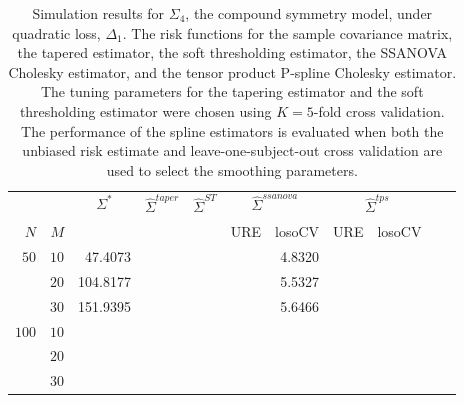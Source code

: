 \documentclass[12pt]{article}
\newcommand{\ra}[1]{\renewcommand{\arraystretch}{#1}}
\theoremstyle{definition}
\begin{document}
\begin{table}\centering
\ra{1.3}
\caption{Simulation results for $\Sigma_4$, the compound symmetry model, under quadratic loss, $\Delta_1$. The risk functions for the sample covariance matrix, the tapered estimator, the soft thresholding estimator, the SSANOVA Cholesky estimator, and the tensor product P-spline Cholesky estimator. The tuning parameters for the tapering estimator and the soft thresholding estimator were chosen using $K = 5$-fold cross validation. The performance of the spline estimators is evaluated when both the unbiased risk estimate and leave-one-subject-out cross validation are used to select the smoothing parameters.}
\begin{tabular}{@{}rrrcrcrrcrr@{}}\toprule
   &            & \multicolumn{1}{c}{$\Sigma^*$}  & \multicolumn{1}{c}{$\hat{\Sigma}^{taper}$} &\multicolumn{1}{c}{$\hat{\Sigma}^{ST}$} &\multicolumn{2}{c}{ $\hat{\Sigma}^{ssanova}$} &  \multicolumn{2}{c}{ $\hat{\Sigma}^{tps}$}\\
$N$ & $M$ 	&	  &	& & \multicolumn{1}{c}{\mbox{URE}} & \multicolumn{1}{c}{\mbox{losoCV}} &\multicolumn{1}{c}{\mbox{URE}} & \multicolumn{1}{c}{\mbox{losoCV}}\\ \midrule
$50$ & $10$ & 47.4073  &&&& 4.8320 && \\
  & $20$  &  104.8177  &&&& 5.5327 &&\\
  & $30$   &  151.9395  &&&& 5.6466 &&\\  \midrule
$100$ & $10$ &&&&&&&\\
& $20$  &&&&&&& \\
& $30$  &&&&&&& \\
\bottomrule
\end{tabular}
\end{table}
\end{document}
